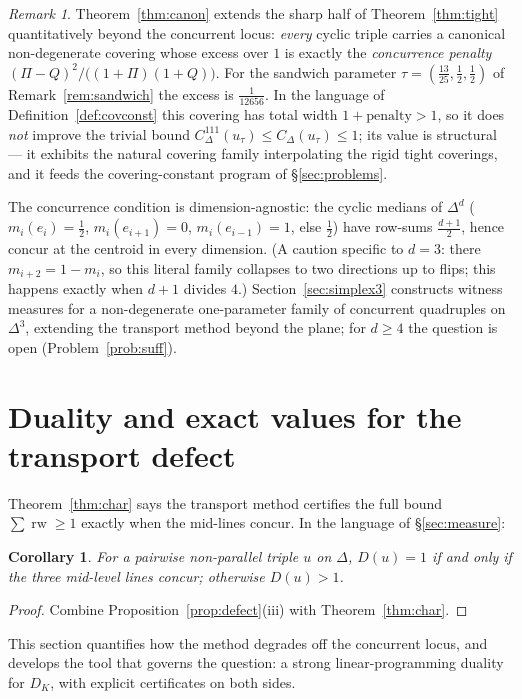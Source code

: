 \documentclass[11pt,reqno]{amsart}
\theoremstyle{plain}
\newtheorem{corollary}[theorem]{Corollary}
\theoremstyle{definition}
\theoremstyle{remark}
\newtheorem{remark}[theorem]{Remark}
\newcommand{\rw}{\operatorname{rw}}
\begin{document}
\begin{remark}\label{rem:canon}
Theorem~\ref{thm:canon} extends the sharp half of Theorem~\ref{thm:tight}
quantitatively beyond the concurrent locus: \emph{every} cyclic triple
carries a canonical non-degenerate covering whose excess over $1$ is exactly
the \emph{concurrence penalty} $(\Pi-Q)^2/\bigl((1+\Pi)(1+Q)\bigr)$. For the
sandwich parameter $\tau=(\tfrac{13}{25},\tfrac12,\tfrac12)$ of
Remark~\ref{rem:sandwich} the excess is $\tfrac1{12656}$. In the language of
Definition~\ref{def:covconst} this covering has total width $1+\text{penalty}>1$,
so it does \emph{not} improve the trivial bound
$C^{111}_\Delta(u_\tau)\le C_\Delta(u_\tau)\le1$; its value is structural --- it
exhibits the natural covering family interpolating the rigid tight coverings,
and it feeds the covering-constant program of \S\ref{sec:problems}.
\end{remark}

\smallskip
The concurrence condition is dimension-agnostic: the cyclic medians of $\Delta^d$
($m_i(e_i)=\tfrac12$, $m_i(e_{i+1})=0$, $m_i(e_{i-1})=1$, else $\tfrac12$) have
row-sums $\tfrac{d+1}2$, hence concur at the centroid in every dimension. (A
caution specific to $d=3$: there $m_{i+2}=1-m_i$, so this literal family collapses
to two directions up to flips; this happens exactly when $d+1$ divides $4$.)
Section~\ref{sec:simplex3} constructs witness measures for a non-degenerate
one-parameter family of concurrent quadruples on $\Delta^3$, extending the
transport method beyond the plane; for $d\ge4$ the question is open
(Problem~\ref{prob:suff}).

\section{Duality and exact values for the transport defect}\label{sec:defect}
Theorem~\ref{thm:char} says the transport method certifies the full bound
$\sum\rw\ge1$ exactly when the mid-lines concur. In the language of
\S\ref{sec:measure}:

\begin{corollary}\label{cor:done}
For a pairwise non-parallel triple $u$ on $\Delta$, $D(u)=1$ if and only if the
three mid-level lines concur; otherwise $D(u)>1$.
\end{corollary}
\begin{proof}
Combine Proposition~\ref{prop:defect}(iii) with Theorem~\ref{thm:char}.
\end{proof}

This section quantifies how the method degrades off the concurrent locus, and
develops the tool that governs the question: a strong linear-programming
duality for $D_K$, with explicit certificates on both sides.
\end{document}
